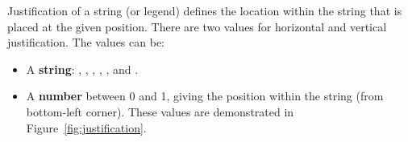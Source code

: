 Justification of a string (or legend) defines the location within the string that is placed at the given position.  There are two values for horizontal and vertical justification.  The values can be:

\begin{itemize}
  \item A {\bf string}: , , , , , and .
  
  \item A {\bf number} between 0 and 1, giving the position within the string (from bottom-left corner).  These values are demonstrated in Figure~\ref{fig:justification}.
\end{itemize}

\begin{figure}[htbp]
  \centering
\end{figure}
